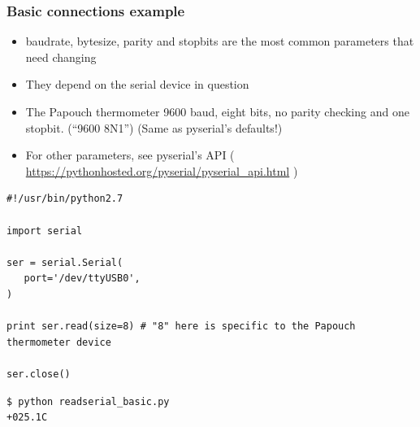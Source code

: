\documentclass[aspectratio=1610,9pt]{beamer} %
\begin{document}
\begin{frame}[fragile]
\frametitle{Basic connections example}

\begin{itemize}[<+->]
\itemsep1pt\parskip0pt
\item<1->
  baudrate, bytesize, parity and stopbits are the most common parameters
  that need changing
\item<2->
  They depend on the serial device in question
\item<3->
  The Papouch thermometer 9600 baud, eight bits, no parity checking and
  one stopbit. (``9600 8N1'') (Same as pyserial's defaults!)
\item<4->
  For other parameters, see pyserial's API (
  \href{https://pythonhosted.org/pyserial/pyserial_api.html}{https://pythonhosted.org/pyserial/pyserial\_api.html}
  )
\end{itemize}
\end{frame}
\begin{frame}[fragile]

\begin{verbatim}
#!/usr/bin/python2.7

import serial

ser = serial.Serial(
   port='/dev/ttyUSB0',
)

print ser.read(size=8) # "8" here is specific to the Papouch thermometer device

ser.close()
\end{verbatim}

\begin{verbatim}
$ python readserial_basic.py
+025.1C
\end{verbatim}

\end{frame}
\end{document}
